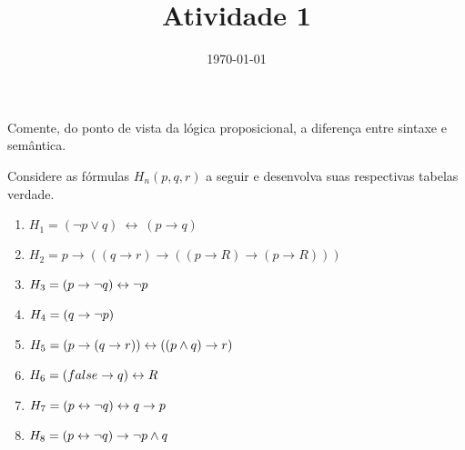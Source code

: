 \documentclass[a4paper, 11pt]{article}
\date{\today}
\title{Atividade 1}
\begin{document}
    \normalfont
    \header{}

    \begin{question}
        Comente, do ponto de vista da lógica proposicional, a diferença entre sintaxe e semântica.
    \end{question}

    \begin{question}
        Considere as fórmulas $H_n(p, q, r)$ a seguir e desenvolva suas respectivas tabelas verdade.
        \begin{enumerate}[\bf \quad a.]
            \item $H_1 = (\lnot p \lor q)~\leftrightarrow~(p \rightarrow q)$
            \item $H_2 = p \rightarrow ((q \rightarrow r) \rightarrow ((p \rightarrow R) \rightarrow (p \rightarrow R)))$ 
            \item $H_3 = (p \rightarrow \lnot q) \leftrightarrow \lnot p $
            \item $H_4 = (q \rightarrow \lnot p) $
            \item $H_5 = (p \rightarrow (q \rightarrow r)) \leftrightarrow ((p \land q) \rightarrow r) $
            \item $H_6 = (false \rightarrow q) \leftrightarrow R$
            \item $H_7 = (p \leftrightarrow \lnot q) \leftrightarrow q \rightarrow p$
            \item $H_8 = (p \leftrightarrow \lnot q) \rightarrow \lnot p \land q$
        \end{enumerate}
    \end{question}

    \begin{question}
        
    \end{question}
\end{document}
